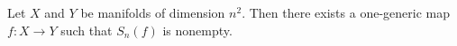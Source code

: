 Let $X$ and $Y$ be manifolds of dimension $n^2$. Then there exists a one-generic map $f: X \rightarrow Y$ such that $S_n(f)$ is nonempty.
